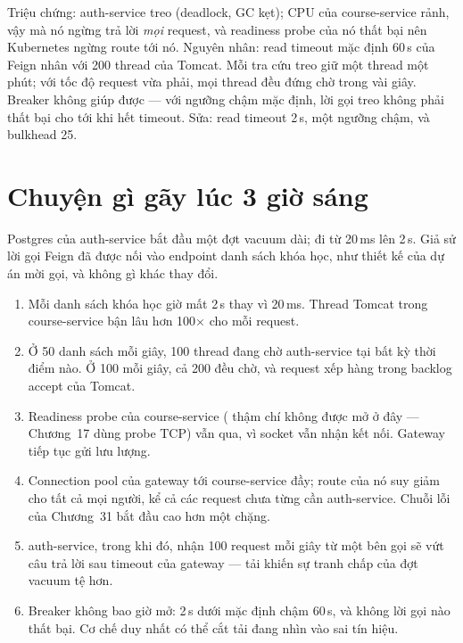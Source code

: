 \begin{pitfall}
Triệu chứng: auth-service treo (deadlock, GC kẹt); CPU của
course-service rảnh, vậy mà nó ngừng trả lời \emph{mọi} request, và
readiness probe của nó thất bại nên Kubernetes ngừng route tới nó.
Nguyên nhân: read timeout mặc định 60\,s của Feign nhân với 200 thread
của Tomcat. Mỗi tra cứu treo giữ một thread một phút; với tốc độ
request vừa phải, mọi thread đều đứng chờ trong vài giây. Breaker không
giúp được --- với ngưỡng chậm mặc định, lời gọi treo không phải thất
bại cho tới khi hết timeout. Sửa: read timeout 2\,s, một ngưỡng chậm,
và bulkhead 25.
\end{pitfall}

\section{Chuyện gì gãy lúc 3 giờ sáng}

Postgres của auth-service bắt đầu một đợt vacuum dài;
 đi từ 20\,ms lên 2\,s. Giả sử lời gọi Feign đã
được nối vào endpoint danh sách khóa học, như thiết kế của dự án mời
gọi, và không gì khác thay đổi.

\begin{enumerate}
  \item Mỗi danh sách khóa học giờ mất 2\,s thay vì 20\,ms. Thread
  Tomcat trong course-service bận lâu hơn 100$\times$ cho mỗi request.
  \item Ở 50 danh sách mỗi giây, 100 thread đang chờ auth-service tại
  bất kỳ thời điểm nào. Ở 100 mỗi giây, cả 200 đều chờ, và request xếp
  hàng trong backlog accept của Tomcat.
  \item Readiness probe của course-service (
  thậm chí không được mở ở đây --- Chương~17 dùng probe TCP) vẫn qua,
  vì socket vẫn nhận kết nối. Gateway tiếp tục gửi lưu lượng.
  \item Connection pool của gateway tới course-service đầy; route
   của nó suy giảm cho tất cả mọi người, kể cả các
  request chưa từng cần auth-service. Chuỗi lỗi của Chương~31 bắt đầu
  cao hơn một chặng.
  \item auth-service, trong khi đó, nhận 100 request mỗi giây từ một
  bên gọi sẽ vứt câu trả lời sau timeout của gateway --- tải khiến sự
  tranh chấp của đợt vacuum tệ hơn.
  \item Breaker không bao giờ mở: 2\,s dưới mặc định chậm 60\,s, và
  không lời gọi nào thất bại. Cơ chế duy nhất có thể cắt tải đang nhìn
  vào sai tín hiệu.
\end{enumerate}

